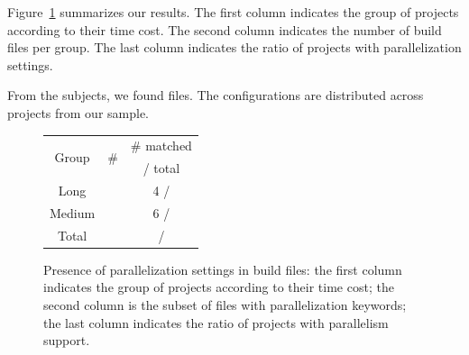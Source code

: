 
Figure~\ref{tab:inspection-table} summarizes our results. The first
column indicates the group of projects according to their time cost.
The second column indicates the number of build files per group. 
The last column indicates the ratio of projects with parallelization settings.

From the \numMedLong{} subjects, we found \pomMedLong{} \pomf{} files.
The \numPomMatched{} configurations are distributed across \numProjectsPar{} projects from our sample.
% 

\begin{figure}[ht!]
    \centering
    \begin{tabular*}{0.48\textwidth}{@{\extracolsep{\fill}}ccc}
        \toprule
        \multirow{2}{*}{Group} %
            & \multirow{2}{*}{\# \pomf{}}
	    & \# \pomf{} matched\\
            & %
            & / total\\%
        \midrule%
	Long   & \numPomLong{} & 4 / \numLong{}\\%
	Medium & \numPomMed{} & 6 / \numMed{}\\%
        \midrule%
        Total %
            & \pomMedLong{}
            & \numProjectsPar{} / \numMedLong{}\\%
        \bottomrule%
    \end{tabular*}
    \caption{Presence of parallelization settings in build files: the
    first column indicates the group of projects according to their
    time cost; the second column is the subset of files with parallelization
    keywords; the last column indicates the ratio of projects with
    parallelism support.}
    \label{tab:inspection-table} 
\end{figure}

